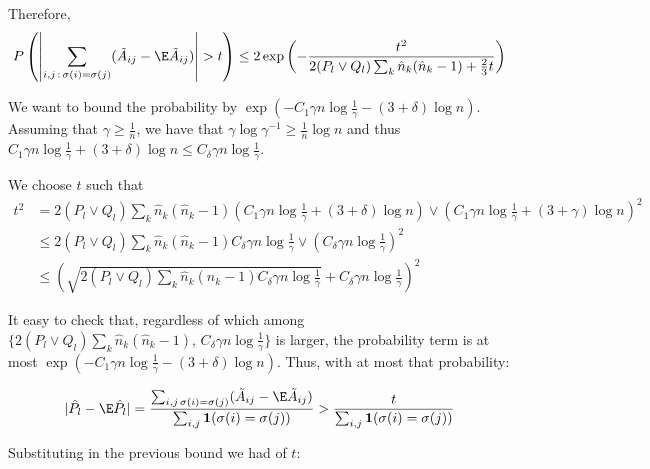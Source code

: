 \documentclass{article}
\begin{document}
Therefore,
\[
P\left( \left| \sum_{i,j\,:\, \sigma(i) = \sigma(j)} (\tilde{A}_{ij} - \E \tilde{A}_{ij} ) \right|  > t 
 \right) \leq 2 \exp\left( 
    - \frac{t^2}{ 2 (P_l \vee Q_l) \sum_k \hat{n}_k (\hat{n}_k - 1)  + \frac{2}{3}t } 
\right)
\]

We want to bound the probability by $\exp( - C_1 \gamma n \log \frac{1}{\gamma} - (3+\delta) \log n )$. Assuming that $\gamma \geq \frac{1}{n}$, we have that $\gamma \log \gamma^{-1} \geq \frac{1}{n} \log n$ and thus $C_1 \gamma n \log \frac{1}{\gamma} + (3 + \delta) \log n \leq C_\delta \gamma n \log \frac{1}{\gamma}$. 

We choose $t$ such that
\begin{align*}
t^2 &= 2 (P_l \vee Q_l) \sum_k \hat{n}_k (\hat{n}_k - 1) \left( 
    C_1 \gamma n \log \frac{1}{\gamma} + (3+\delta) \log n \right) \vee 
   \left( C_1 \gamma n \log \frac{1}{\gamma} + (3 + \gamma) \log n \right)^2  \\
 &\leq 2 (P_l \vee Q_l) \sum_k \hat{n}_k (\hat{n}_k - 1) C_{\delta} \gamma n \log \frac{1}{\gamma} \vee \left( C_\delta \gamma n \log \frac{1}{\gamma} \right)^2  \\
 &\leq \left( \sqrt{  2 (P_l \vee Q_l)  \sum_k \hat{n}_k (\hat{n}_k - 1) C_\delta \gamma n \log \frac{1}{\gamma} } + C_\delta \gamma n \log \frac{1}{\gamma} \right)^2
\end{align*}

It easy to check that, regardless of which among $\{ 2 (P_l \vee Q_l) \sum_k \hat{n}_k (\hat{n}_k - 1) ,\, C_\delta \gamma n \log \frac{1}{\gamma} \}$ is larger, the probability term is at most $\exp( - C_1 \gamma n \log \frac{1}{\gamma} - (3+\delta) \log n )$. Thus, with at most that probability:

\begin{align*}
| \hat{P}_l - \E \hat{P}_l | =
\frac{\sum_{i,j \, \sigma(i) = \sigma(j)} (\tilde{A}_{ij} - \E \tilde{A}_{ij} ) }{
  \sum_{i,j} \mathbf{1}( \sigma(i) = \sigma(j) ) } &> 
  \frac{t}{\sum_{i,j} \mathbf{1}(\sigma(i) = \sigma(j)) } \\
\end{align*}

Substituting in the previous bound we had of $t$:
\end{document}
